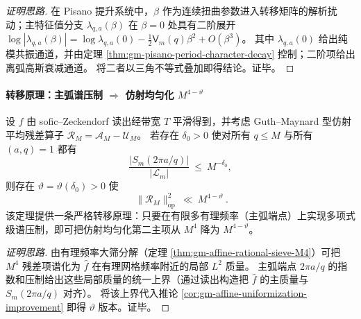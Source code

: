 \begin{proof}[证明思路]
在 Pisano 提升系统中，\(\beta\) 作为连续扭曲参数进入转移矩阵的解析扰动；主特征值分支 \(\lambda_{q,a}(\beta)\) 在 \(\beta=0\) 处具有二阶展开
\(
\log|\lambda_{q,a}(\beta)|=\log\lambda_{q,a}(0)-\tfrac12\mathsf{V}_m(q)\beta^2+O(\beta^3)
\)。
其中 \(\lambda_{q,a}(0)\) 给出纯模共振通道，并由定理 \ref{thm:gm-pisano-period-character-decay} 控制；二阶项给出离弧高斯衰减通道。
将二者以三角不等式叠加即得结论。证毕。
\end{proof}

\paragraph{转移原理：主弧谱压制 \texorpdfstring{$\Rightarrow$}{=>} 仿射均匀化 \texorpdfstring{$M^{4-\vartheta}$}{M4-vtheta}}
\begin{theorem}[模主弧谱压制 \texorpdfstring{$\Rightarrow$}{=>} 仿射均匀化幂次节省：从 Pisano 频谱到 \texorpdfstring{$M^{4-\vartheta}$}{M4-vtheta}]\label{thm:gm-mod-gap-to-affine-saving}
设 \(f\) 由 sofic--Zeckendorf 读出经带宽 \(T\) 平滑得到，并考虑 Guth--Maynard 型仿射平均残差算子 \(\mathcal{R}_M=\mathcal{A}_M-\mathcal{U}_M\)。
若存在 \(\delta_0>0\) 使对所有 \(q\le M\) 与所有 \((a,q)=1\) 都有
\[
\frac{|S_m(2\pi a/q)|}{|\mathcal{L}_m|}\ \le\ M^{-\delta_0},
\]
则存在 \(\vartheta=\vartheta(\delta_0)>0\) 使
\[
\boxed{\ \|\mathcal{R}_M\|_{\mathrm{op}}^2\ \ll\ M^{4-\vartheta}\ }.
\]
该定理提供一条严格转移原理：只要在有限多有理频率（主弧端点）上实现多项式级谱压制，即可把仿射均匀化第二主项从 \(M^4\) 降为 \(M^{4-\vartheta}\)。
\end{theorem}

\begin{proof}[证明思路]
由有理频率大筛分解（定理 \ref{thm:gm-affine-rational-sieve-M4}）可把 \(M^4\) 残差项谱化为 \(\widehat f\) 在有理网格频率附近的局部 \(L^2\) 质量。
主弧端点 \(2\pi a/q\) 的指数和压制给出这些局部质量的统一上界（通过读出构造把 \(\widehat f\) 的主质量与 \(S_m(2\pi a/q)\) 对齐）。
将该上界代入推论 \ref{cor:gm-affine-uniformization-improvement} 即得 \(\vartheta\) 版本。证毕。
\end{proof}

